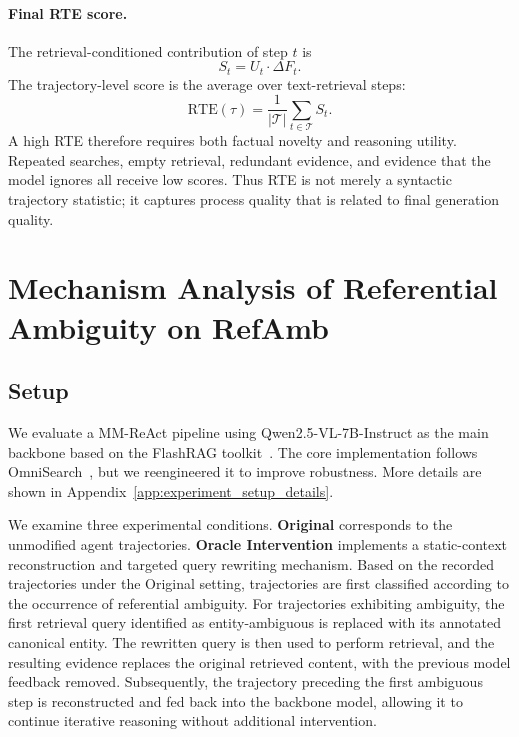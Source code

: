\documentclass{article} %
\newcommand{\rte}{\mathrm{RTE}}
\newcommand{\df}{\Delta F}
\begin{document}
\paragraph{Final RTE score.}
The retrieval-conditioned contribution of step $t$ is
\begin{equation}
    S_t = U_t \cdot \df_t.
    \label{eq:s_t}
\end{equation}
The trajectory-level score is the average over text-retrieval steps:
\begin{equation}
    \rte(\tau) = \frac{1}{|\mathcal{T}|}\sum_{t\in\mathcal{T}} S_t.
    \label{eq:rte}
\end{equation}
A high RTE therefore requires both factual novelty and reasoning utility.
Repeated searches, empty retrieval, redundant evidence, and evidence that the model ignores all receive low scores.
Thus RTE is not merely a syntactic trajectory statistic; it captures process quality that is related to final generation quality.

\section{Mechanism Analysis of Referential Ambiguity on RefAmb}


\subsection{Setup}
We evaluate a MM-ReAct pipeline using Qwen2.5-VL-7B-Instruct as the main backbone based on the FlashRAG toolkit~\citep{jin2025flashrag}. The core implementation follows OmniSearch~\citep{li2024benchmarking}, but we reengineered it to improve robustness. More details are shown in Appendix~\ref{app:experiment_setup_details}.

We examine three experimental conditions.
\textbf{Original} corresponds to the unmodified agent trajectories.
\textbf{Oracle Intervention} implements a static-context reconstruction and targeted query rewriting mechanism. Based on the recorded trajectories under the Original setting, trajectories are first classified according to the occurrence of referential ambiguity. For trajectories exhibiting ambiguity, the first retrieval query identified as entity-ambiguous is replaced with its annotated canonical entity. The rewritten query is then used to perform retrieval, and the resulting evidence replaces the original retrieved content, with the previous model feedback removed. Subsequently, the trajectory preceding the first ambiguous step is reconstructed and fed back into the backbone model, allowing it to continue iterative reasoning without additional intervention.
\end{document}
